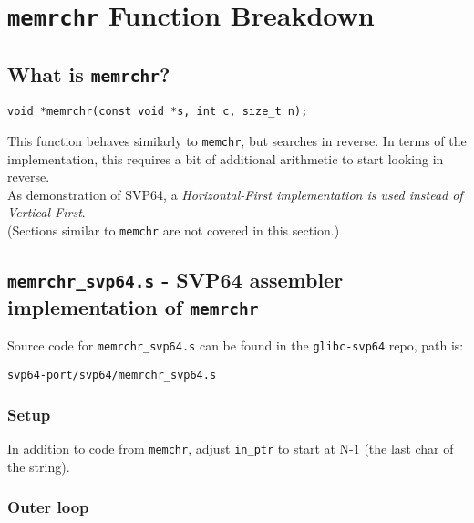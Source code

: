 %
\section{\texttt{memrchr} Function Breakdown}

\subsection{What is \texttt{memrchr}?}

\begin{verbatim}
void *memrchr(const void *s, int c, size_t n);
\end{verbatim}

This function behaves similarly to \texttt{memchr}, but searches in reverse.
In terms of the implementation, this requires a bit of additional arithmetic
to start looking in reverse.\\

As demonstration of SVP64, a \textit{Horizontal-First implementation is used
instead of Vertical-First}.\\

(Sections similar to \texttt{memchr} are not covered in this section.)

\subsection{\texttt{memrchr\_svp64.s} - SVP64 assembler implementation of \texttt{memrchr}}

Source code for \texttt{memrchr\_svp64.s} can be found in the
\texttt{glibc-svp64} repo, path is:
\begin{verbatim}
svp64-port/svp64/memrchr_svp64.s
\end{verbatim}

\subsubsection{Setup}

In addition to code from \texttt{memchr}, adjust \texttt{in\_ptr}
to start at N-1 (the last char of the string).

\subsubsection{Outer loop}

